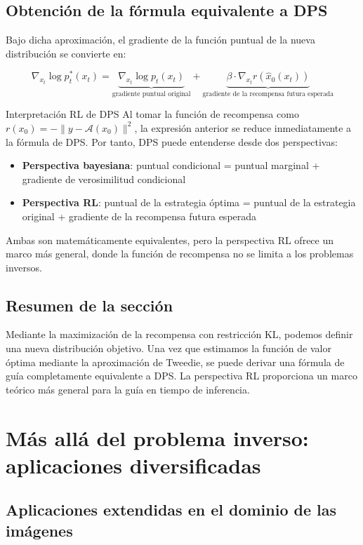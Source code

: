 \documentclass[a4paper]{article}
\begin{document}
\subsection{Obtención de la fórmula equivalente a DPS}

Bajo dicha aproximación, el gradiente de la función puntual de la nueva distribución se convierte en:

$$\nabla_{x_t} \log p_t^*(x_t) = \underbrace{\nabla_{x_t} \log p_t(x_t)}_{\text{gradiente puntual original}} + \underbrace{\beta \cdot \nabla_{x_t} r(\hat{x}_0(x_t))}_{\text{gradiente de la recompensa futura esperada}}$$

\begin{importantbox}{Interpretación RL de DPS}
Al tomar la función de recompensa como $r(x_0) = -\| y - \mathcal{A}(x_0) \|^2$, la expresión anterior se reduce inmediatamente a la fórmula de DPS. Por tanto, DPS puede entenderse desde dos perspectivas:
\begin{itemize}
    \item \textbf{Perspectiva bayesiana}: puntual condicional = puntual marginal + gradiente de verosimilitud condicional
    \item \textbf{Perspectiva RL}: puntual de la estrategia óptima = puntual de la estrategia original + gradiente de la recompensa futura esperada
\end{itemize}
Ambas son matemáticamente equivalentes, pero la perspectiva RL ofrece un marco más general, donde la función de recompensa no se limita a los problemas inversos.
\end{importantbox}

\subsection{Resumen de la sección}

Mediante la maximización de la recompensa con restricción KL, podemos definir una nueva distribución objetivo. Una vez que estimamos la función de valor óptima mediante la aproximación de Tweedie, se puede derivar una fórmula de guía completamente equivalente a DPS. La perspectiva RL proporciona un marco teórico más general para la guía en tiempo de inferencia.

\section{Más allá del problema inverso: aplicaciones diversificadas}

\subsection{Aplicaciones extendidas en el dominio de las imágenes}
\end{document}
